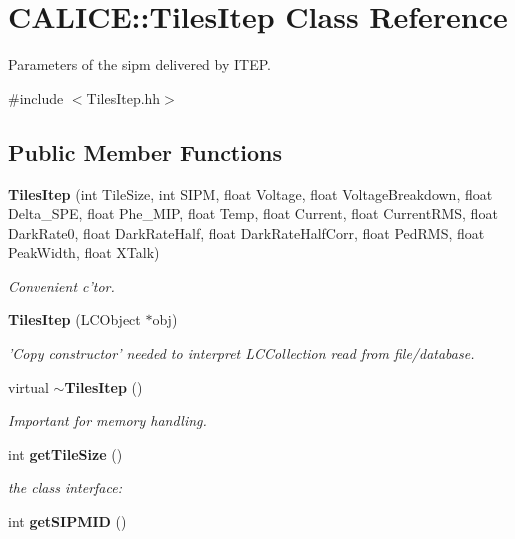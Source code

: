 \section{CALICE::TilesItep Class Reference}
\label{classCALICE_1_1TilesItep}


Parameters of the sipm delivered by ITEP.  


{\ttfamily \#include $<$TilesItep.hh$>$}\subsection*{Public Member Functions}
\begin{DoxyCompactItemize}
\item 
{\bf TilesItep} (int TileSize, int SIPM, float Voltage, float VoltageBreakdown, float Delta\_\-SPE, float Phe\_\-MIP, float Temp, float Current, float CurrentRMS, float DarkRate0, float DarkRateHalf, float DarkRateHalfCorr, float PedRMS, float PeakWidth, float XTalk)\label{classCALICE_1_1TilesItep_ab520e15a1890c3b126d618ae50203149}

\begin{DoxyCompactList}\small\item\em Convenient c'tor. \item\end{DoxyCompactList}\item 
{\bf TilesItep} (LCObject $\ast$obj)\label{classCALICE_1_1TilesItep_a252385be65292a3685b811971c77936e}

\begin{DoxyCompactList}\small\item\em 'Copy constructor' needed to interpret LCCollection read from file/database. \item\end{DoxyCompactList}\item 
virtual {\bf $\sim$TilesItep} ()\label{classCALICE_1_1TilesItep_a4e78e1645521257e9f203f41b05dd11d}

\begin{DoxyCompactList}\small\item\em Important for memory handling. \item\end{DoxyCompactList}\item 
int {\bf getTileSize} ()\label{classCALICE_1_1TilesItep_a8c37e7a95a4c75865367802e07bf4d9e}

\begin{DoxyCompactList}\small\item\em the class interface: \item\end{DoxyCompactList}\item 
int {\bfseries getSIPMID} ()\label{classCALICE_1_1TilesItep_ac8ee2c984e4ebbbd46f9302ff15d0aa4}


\end{DoxyCompactItemize}
